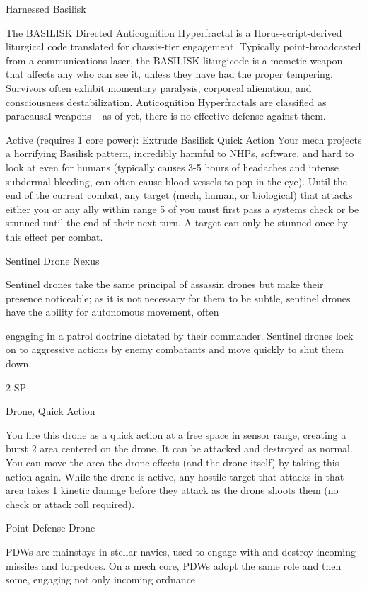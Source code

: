                                              Harnessed Basilisk

 The BASILISK Directed Anticognition Hyperfractal is a Horus-script-derived liturgical code translated for
 chassis-tier engagement. Typically point-broadcasted from a communications laser, the BASILISK
 liturgicode is a memetic weapon that affects any who can see it, unless they have had the proper
 tempering. Survivors often exhibit momentary paralysis, corporeal alienation, and consciousness
 destabilization. Anticognition Hyperfractals are classified as paracausal weapons -- as of yet, there is no
 effective defense against them.

 Active (requires 1 core power):
 Extrude Basilisk
 Quick Action
 Your mech projects a horrifying Basilisk pattern, incredibly harmful to NHPs, software, and hard to look
 at even for humans (typically causes 3-5 hours of headaches and intense subdermal bleeding, can
 often cause blood vessels to pop in the eye). Until the end of the current combat, any target (mech,
 human, or biological) that attacks either you or any ally within range 5 of you must first pass a systems
 check or be stunned until the end of their next turn. A target can only be stunned once by this effect per
 combat.

Sentinel Drone Nexus

Sentinel drones take the same principal of assassin drones but make their presence noticeable; as it is not
necessary for them to be subtle, sentinel drones have the ability for autonomous movement, often




engaging in a patrol doctrine dictated by their commander. Sentinel drones lock on to aggressive actions
by enemy combatants and move quickly to shut them down.

2 SP

Drone, Quick Action

You fire this drone as a quick action at a free space in sensor range, creating a burst 2 area
centered on the drone. It can be attacked and destroyed as normal. You can move the area the
drone effects (and the drone itself) by taking this action again. While the drone is active, any
hostile target that attacks in that area takes 1 kinetic damage before they attack as the drone
shoots them (no check or attack roll required).


Point Defense Drone

PDWs are mainstays in stellar navies, used to engage with and destroy incoming missiles and torpedoes.
On a mech core, PDWs adopt the same role and then some, engaging not only incoming ordnance


